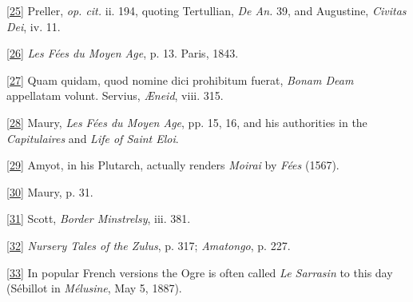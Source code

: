 \documentclass[14pt,a4paper]{memoir}
\begin{document}
\protect\hypertarget{4533318093929944247_33931-h-0.htm.xhtmlux5cux23Footnote_25}{}{}
\protect\hyperlink{4533318093929944247_33931-h-0.htm.xhtmlux5cux23FNanchor_25}{{{[}25{]}}}
Preller, \emph{op. cit.} ii. 194, quoting Tertullian, \emph{De An.} 39,
and Augustine, \emph{Civitas Dei}, iv. 11.

\protect\hypertarget{4533318093929944247_33931-h-0.htm.xhtmlux5cux23Footnote_26}{}{}
\protect\hyperlink{4533318093929944247_33931-h-0.htm.xhtmlux5cux23FNanchor_26}{{{[}26{]}}}
\emph{Les Fées du Moyen Age}, p. 13. Paris, 1843.

\protect\hypertarget{4533318093929944247_33931-h-0.htm.xhtmlux5cux23Footnote_27}{}{}
\protect\hyperlink{4533318093929944247_33931-h-0.htm.xhtmlux5cux23FNanchor_27}{{{[}27{]}}}
Quam quidam, quod nomine dici prohibitum fuerat, \emph{Bonam Deam}
appellatam volunt. Servius, \emph{Æneid}, viii. 315.

\protect\hypertarget{4533318093929944247_33931-h-0.htm.xhtmlux5cux23Footnote_28}{}{}
\protect\hyperlink{4533318093929944247_33931-h-0.htm.xhtmlux5cux23FNanchor_28}{{{[}28{]}}}
Maury, \emph{Les Fées du Moyen Age}, pp. 15, 16, and his authorities in
the \emph{Capitulaires} and \emph{Life of Saint Eloi}.

\protect\hypertarget{4533318093929944247_33931-h-0.htm.xhtmlux5cux23Footnote_29}{}{}
\protect\hyperlink{4533318093929944247_33931-h-0.htm.xhtmlux5cux23FNanchor_29}{{{[}29{]}}}
Amyot, in his Plutarch, actually renders \emph{Moirai} by \emph{Fées}
(1567).

\protect\hypertarget{4533318093929944247_33931-h-0.htm.xhtmlux5cux23Footnote_30}{}{}
\protect\hyperlink{4533318093929944247_33931-h-0.htm.xhtmlux5cux23FNanchor_30}{{{[}30{]}}}
Maury, p. 31.

\protect\hypertarget{4533318093929944247_33931-h-0.htm.xhtmlux5cux23Footnote_31}{}{}
\protect\hyperlink{4533318093929944247_33931-h-0.htm.xhtmlux5cux23FNanchor_31}{{{[}31{]}}}
Scott, \emph{Border Minstrelsy}, iii. 381.

\protect\hypertarget{4533318093929944247_33931-h-0.htm.xhtmlux5cux23Footnote_32}{}{}
\protect\hyperlink{4533318093929944247_33931-h-0.htm.xhtmlux5cux23FNanchor_32}{{{[}32{]}}}
\emph{Nursery Tales of the Zulus}, p. 317; \emph{Amatongo}, p. 227.

\protect\hypertarget{4533318093929944247_33931-h-0.htm.xhtmlux5cux23Footnote_33}{}{}
\protect\hyperlink{4533318093929944247_33931-h-0.htm.xhtmlux5cux23FNanchor_33}{{{[}33{]}}}
In popular French versions the Ogre is often called \emph{Le Sarrasin}
to this day (Sébillot in \emph{Mélusine}, May 5, 1887).
\end{document}
